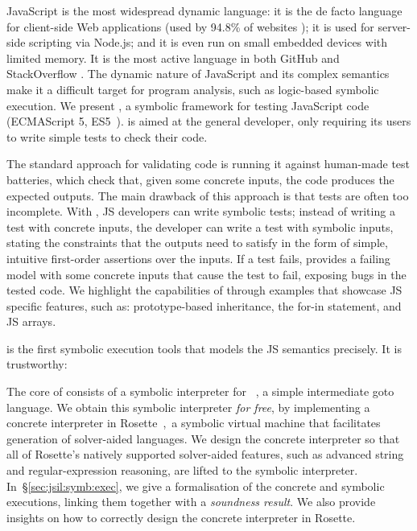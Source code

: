 
JavaScript is the most widespread dynamic language: it is the de facto language for client-side Web applications (used by 94.8\% of websites \cite{JS948percent});
it is used for server-side scripting via Node.js; and it is even run on small embedded devices with limited 
memory. It is the most active language in both GitHub \cite{GithubActive} and StackOverflow \cite{SOActive}.
The dynamic nature of JavaScript and its complex semantics make it a difficult target for
program analysis, such as logic-based symbolic execution.  
We present \jilette, a symbolic framework for testing JavaScript code (ECMAScript 5, ES5~\cite{ecma}). 
%
\jilette is aimed at the general developer, only requiring its users to write simple tests to check their code. 


The standard approach for validating code is running it against 
human-made test batteries, which check that, given some concrete inputs, the code produces the expected
outputs. The main drawback of this approach is that tests are often
too incomplete. With \jilette, JS developers can write symbolic tests; instead of 
writing a test with concrete inputs, the developer can write a test with symbolic inputs,
stating the constraints that the outputs need to satisfy in the form of simple, intuitive 
first-order assertions over the inputs. If a test fails, \jilette provides a failing model with some 
concrete inputs that cause the test to fail, exposing bugs in the tested code. 
We highlight the capabilities of \jilette through examples that showcase
JS specific features, such as: prototype-based inheritance, 
the for-in statement, and JS arrays.


\jiette is the first symbolic execution tools that models the JS semantics precisely. 
It is trustworthy: 







The core of \jilette consists of a symbolic interpreter for
\jsil~\cite{javert}, a simple intermediate goto language. 
We obtain this symbolic interpreter \emph{for free}, 
by implementing a concrete \jsil interpreter in Rosette~\cite{Rosette2,Rosette1},~a 
symbolic virtual machine that facilitates generation of solver-aided languages.
We design the concrete interpreter so that all of Rosette's natively supported solver-aided
features, such as advanced string and regular-expression reasoning, 
are lifted to the \jsil symbolic interpreter. 
In~\S\ref{sec:jsil:symb:exec}, we give a formalisation of the \jsil concrete and symbolic executions, linking them together with a {\em soundness result}. We also provide insights on how to correctly design the concrete \jsil interpreter in Rosette.


